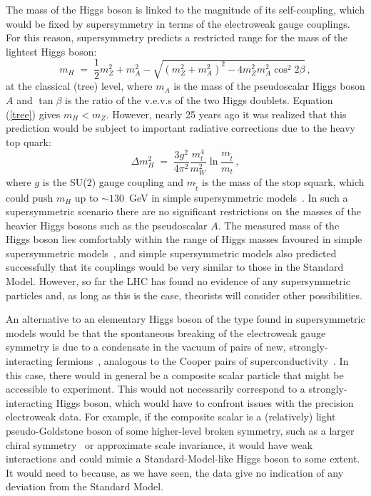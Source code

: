 \documentclass[12pt]{article}
\newcommand{\beq}{\begin{equation}}
\newcommand{\eeq}{\end{equation}}
\numberwithin{equation}{section}
\begin{document}
The mass of the Higgs boson is linked to the magnitude of its self-coupling,
which would be fixed by supersymmetry in terms of the electroweak gauge
couplings. For this reason, supersymmetry predicts a restricted range for the mass
of the lightest Higgs boson:
\beq
m_H \; = \; \frac{1}{2} m_Z^2 + m_A^2 - \sqrt{(m_Z^2 + m_A^2)^2 - 4 m_Z^2 m_A^2 \cos^2 2 \beta} \, ,
\label{tree}
\eeq
at the classical (tree) level, where $m_A$ is the mass of the pseudoscalar Higgs boson $A$
and $\tan \beta$ is the ratio of the v.e.v.s of the two Higgs doublets.
Equation (\ref{tree}) gives $m_H< m_Z$. However, nearly 25 years ago it was realized that this prediction would be subject
to important radiative corrections due to the heavy top quark:
\beq
\Delta m_H^2 \; = \; \frac{3g^2}{4 \pi^2} \frac{m_t^4}{m_W^2} \ln \frac{m_{\tilde t}}{m_t} \, ,
\label{loop}
\eeq
where $g$ is the SU(2) gauge coupling and $m_{\tilde t}$ is the mass of the stop squark, which could push $m_H$ up to $\sim 130$~GeV
in simple supersymmetric models~\cite{ERZ}. In such a supersymmetric scenario there are no 
significant restrictions on the masses of the heavier Higgs bosons such as the pseudoscalar $A$.
The measured mass of the Higgs boson lies comfortably within
the range of Higgs masses favoured in simple supersymmetric models~\cite{ENOS}, and simple supersymmetric
models also predicted successfully that its couplings would be very similar to those in the Standard Model.
However, so far the LHC has found no evidence of any supersymmetric particles
and, as long as this is the case, theorists will consider other possibilities.

An alternative to an elementary Higgs boson of the type found in supersymmetric models would be that the
spontaneous breaking of the electroweak gauge symmetry is due to a condensate in
the vacuum of pairs of new, strongly-interacting fermions~\cite{TC}, analogous to the Cooper pairs
of superconductivity~\cite{Cooper}. In this case, there would in
general be a composite scalar particle that might be accessible to experiment. This would not necessarily
correspond to a strongly-interacting Higgs boson, which would
have to confront issues with the precision electroweak data. For example, if the composite scalar is a (relatively) light
pseudo-Goldstone boson of some higher-level broken symmetry, such as a larger chiral
symmetry~\cite{littleH} or approximate scale invariance, it would have weak interactions and could
mimic a Standard-Model-like Higgs boson to some extent. It would need to because, as we have seen, the data
give no indication of any deviation from the Standard Model.
\end{document}
